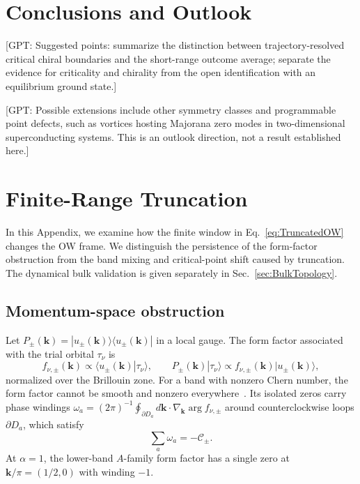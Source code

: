 \documentclass[aps,prb,10pt,twocolumn,superscriptaddress,longbibliography,floatfix]{revtex4-2}
\newcommand{\mc}[1]{\mathcal{#1}}
\newcommand{\bk}{\boldsymbol k}
\newcommand{\GPT}[1]{{\color{magenta}[GPT: #1]}}
\begin{document}
{\color{blue}\section{Conclusions and Outlook}
\label{sec:Conclusions}}

\GPT{Suggested points: summarize the distinction between trajectory-resolved critical chiral boundaries and the short-range outcome average; separate the evidence for criticality and chirality from the open identification with an equilibrium ground state.}

\GPT{Possible extensions include other symmetry classes and programmable point defects, such as vortices hosting Majorana zero modes in two-dimensional superconducting systems. This is an outlook direction, not a result established here.}


\appendix
\setcounter{figure}{0}
\renewcommand{\thefigure}{A\arabic{figure}}
\renewcommand{\theHfigure}{A\arabic{figure}}

{\color{blue}\section{Finite-Range Truncation}
\label{app:Truncation}}

{\color{blue}
In this Appendix, we examine how the finite window in Eq.~\eqref{eq:TruncatedOW} changes the OW frame. We distinguish the persistence of the form-factor obstruction from the band mixing and critical-point shift caused by truncation. The dynamical bulk validation is given separately in Sec.~\ref{sec:BulkTopology}.
}

\subsection{Momentum-space obstruction}

Let $P_\pm(\bk)=|u_\pm(\bk)\rangle\langle u_\pm(\bk)|$ in a local gauge. The form factor associated with the trial orbital $\tau_\nu$ is
\begin{equation}
    f_{\nu,\pm}(\bk)\propto\langle u_\pm(\bk)|\tau_\nu\rangle,
    \qquad
    P_\pm(\bk)|\tau_\nu\rangle\propto f_{\nu,\pm}(\bk)|u_\pm(\bk)\rangle,
    \label{eq:FormFactor}
\end{equation}
normalized over the Brillouin zone. For a band with nonzero Chern number, the form factor cannot be smooth and nonzero everywhere~\cite{BhuiyanPanJian2026}. Its isolated zeros carry phase windings $\omega_a=(2\pi)^{-1}\oint_{\partial D_a}d\bk\cdot\nabla_{\bk}\arg f_{\nu,\pm}$ around counterclockwise loops $\partial D_a$, which satisfy
\begin{equation}
    \sum_a\omega_a=-\mc C_\pm.
    \label{eq:ZeroWinding}
\end{equation}
At $\alpha=1$, the lower-band $A$-family form factor has a single zero at $\bk/\pi=(1/2,0)$ with winding $-1$.
\end{document}

